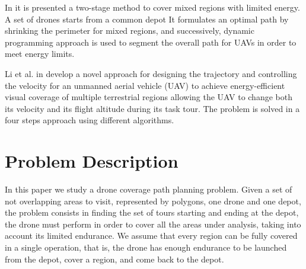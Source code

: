 \documentclass[12pt]{elsarticle}
\newcommand{\CV}[1]{{\color{blue}#1}}
\begin{document}
 
In \cite{art:Wang2024} it is presented a two-stage method to cover mixed regions with limited energy. A set of drones starts from a common depot It formulates an optimal path by shrinking the perimeter for mixed regions, and successively, dynamic programming  approach is used to segment the overall path for UAVs in order to meet energy limits.

Li et al. in\cite{Li2025} develop a novel approach for designing the trajectory and controlling the velocity for an unmanned aerial vehicle (UAV) to achieve energy-efficient visual coverage of multiple terrestrial regions allowing the UAV to change both its velocity and its flight altitude during its task tour. The problem is solved in a four steps approach using different algorithms.






\section{Problem Description}\label{section:description}
In this paper we study a drone coverage path planning problem. Given a set of not overlapping areas to visit, represented by polygons, one drone and one depot, the problem consists in finding the set of tours starting and ending at the depot, the drone must perform in order to cover all the areas under analysis, taking into account its limited endurance. \CV{We assume that every region can be fully covered in a single operation, that is, the drone has enough endurance to be launched from the depot, cover a region, and come back to the depot.}
\end{document}
